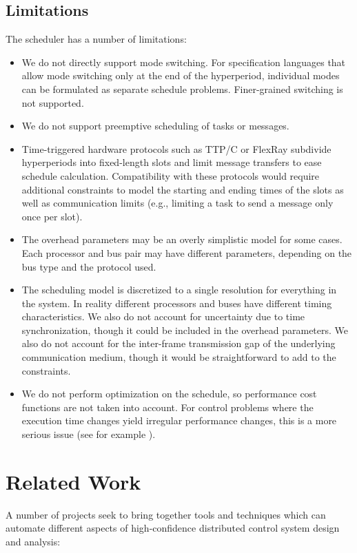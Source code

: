 \subsection{Limitations}

The scheduler has a number of limitations:

\begin{itemize}
\item We do not directly support mode switching. For specification languages that allow mode switching 
only at the end of the hyperperiod, individual modes can be formulated as separate schedule problems.  
Finer-grained switching is not supported.
\item We do not support preemptive scheduling of tasks or messages.
\item Time-triggered hardware protocols such as TTP/C or FlexRay subdivide hyperperiods into fixed-length 
slots and limit message transfers to ease schedule calculation. Compatibility with these protocols would 
require additional constraints to model the starting and ending times of the slots as well as 
communication limits (e.g., limiting a task to send a message only once per slot).
\item The overhead parameters may be an overly simplistic model for some cases. Each processor and bus 
pair may have different parameters, depending on the bus type and the protocol used.
\item The scheduling model is discretized to a single resolution for everything in the system.  
In reality different processors and buses have different timing characteristics. We also do not account 
for uncertainty due to time synchronization, though it could be included in the overhead parameters.  We 
also do not account for the inter-frame transmission gap of the underlying communication medium, though 
it would be straightforward to add to the constraints.
\item We do not perform optimization on the schedule, so performance cost functions are not taken into 
account.  For control problems where the execution time changes yield irregular performance changes, this 
is a more serious issue (see for example \cite{control:scheduling} ).
\end{itemize}


\section{Related Work}


A number of projects seek to bring together tools and techniques which can automate different
aspects of high-confidence distributed control system design and analysis:

